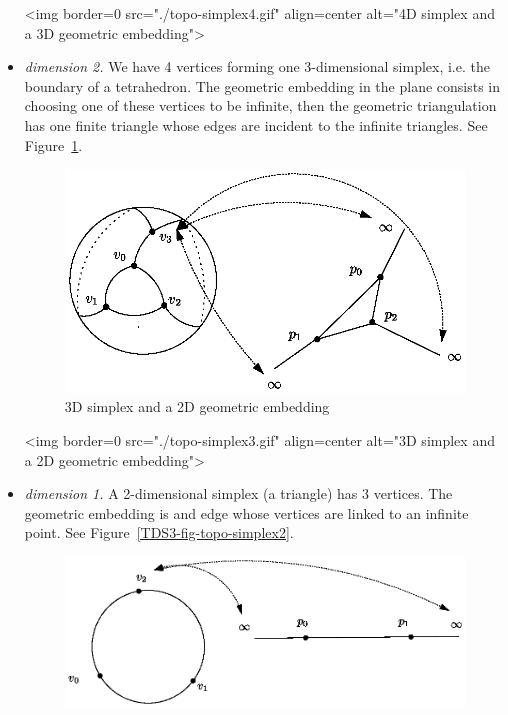 \begin{itemize}
\begin{ccTexOnly}
\end{ccTexOnly}
\begin{ccHtmlOnly}
<img border=0 src="./topo-simplex4.gif" align=center
alt="4D simplex and a 3D geometric embedding">
\end{ccHtmlOnly}
\item \emph{dimension 2.} We have 4 vertices forming one 3-dimensional
simplex, i.e. the boundary of a tetrahedron. The geometric embedding in
the plane consists in choosing one of these vertices to be infinite,
then the geometric triangulation has one finite triangle whose edges are
incident to the infinite triangles. See Figure~\ref{TDS3-fig-topo-simplex3}.
\begin{ccTexOnly}
\begin{figure}
\begin{center} 
\includegraphics{topo-simplex3.eps}
\end{center}
\caption{3D simplex and a 2D geometric embedding \label{TDS3-fig-topo-simplex3}}
\end{figure} 
\end{ccTexOnly}
\begin{ccHtmlOnly}
<img border=0 src="./topo-simplex3.gif" align=center
alt="3D simplex and a 2D geometric embedding">
\end{ccHtmlOnly}
\item \emph{dimension 1.} A 2-dimensional simplex (a triangle) has 3
vertices. The geometric embedding is and edge whose vertices are linked
to an infinite point.  See Figure~\ref{TDS3-fig-topo-simplex2}.
\begin{ccTexOnly}
\begin{figure}
\begin{center} 
\includegraphics{topo-simplex2.eps}

\end{center}
\end{figure}
\end{ccTexOnly}
\end{itemize}
